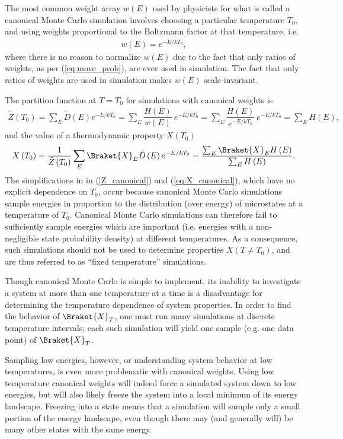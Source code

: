\documentclass[11pt]{article}
\newcommand{\bk}{\Braket} %
\newcommand{\f}[2]{\dfrac{#1}{#2}} %
\newcommand{\p}[1]{\left(#1\right)} %
\begin{document}
The most common weight array $w\p{E}$ used by physicists for what is
called a canonical Monte Carlo simulation involves choosing a
particular temperature $T_0$, and using weights proportional to the
Boltzmann factor at that temperature, i.e.
\begin{align}
  w\p{E}=e^{-E/kT_0},
\end{align}
where there is no reason to normalize $w\p{E}$ due to the fact that
only ratios of weights, as per (\ref{eq:move_prob}), are ever used in
simulation. The fact that only ratios of weights are used in
simulation makes $w\p{E}$ scale-invariant.

The partition function at $T=T_0$ for simulations with canonical
weights is
\begin{align}
  \tilde Z\p{T_0}=\sum_E\tilde D\p{E}e^{-E/kT_0}
  =\sum_E\f{H\p{E}}{w\p{E}}~e^{-E/kT_0}
  =\sum_E\f{H\p{E}}{e^{-E/kT_0}}~e^{-E/kT_0}=\sum_EH\p{E},
  \label{Z_canonical}
\end{align}
and the value of a thermodynamic property $X\p{T_0}$
\begin{align}
  X\p{T_0}=\f1{\tilde Z\p{T_0}}\sum_E\bk{X}_E\tilde D\p{E}e^{-E/kT_0}
  =\f{\sum_E\bk{X}_EH\p{E}}{\sum_EH\p{E}}.
  \label{eq:X_canonical}
\end{align}
The simplifications in in (\ref{Z_canonical}) and
(\ref{eq:X_canonical}), which have no explicit dependence on $T_0$,
occur because canonical Monte Carlo simulations sample energies in
proportion to the distribution (over energy) of microstates at a
temperature of $T_0$.  Canonical Monte Carlo simulations can therefore
fail to sufficiently sample energies which are important
(i.e. energies with a non-negligible state probability density) at
different temperatures. As a consequence, such simulations should not
be used to determine properties $X\p{T\ne T_0}$, and are thus referred
to as ``fixed temperature'' simulations.

Though canonical Monte Carlo is simple to implement, its inability to
investigate a system at more than one temperature at a time is a
disadvantage for determining the temperature dependence of system
properties. In order to find the behavior of $\bk{X}_T$, one must run
many simulations at discrete temperature intervals; each such
simulation will yield one sample (e.g. one data point) of $\bk{X}_T$.

Sampling low energies, however, or understanding system behavior at
low temperatures, is even more problematic with canonical
weights. Using low temperature canonical weights will indeed force a
simulated system down to low energies, but will also likely freeze the
system into a local minimum of its energy landscape. Freezing into a
state means that a simulation will sample only a small portion of the
energy landscape, even though there may (and generally will) be many
other states with the same energy.
\end{document}
